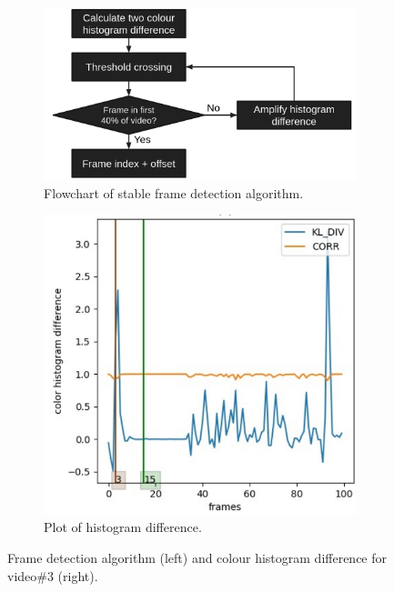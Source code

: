 \documentclass[journal,onecolumn,12pt]{IEEEtran}
\begin{document}
\begin{figure}[h]
	\centering
	\begin{subfigure}[b]{0.55\textwidth}
		\centering
		\includegraphics[width=\textwidth]{images/detectFrame.png}
		\caption{Flowchart of stable frame detection algorithm.}
		\label{fig:detectFrame}
	\end{subfigure}
	\begin{subfigure}[b]{0.35\textwidth}  
		\centering 
		\includegraphics[width=\textwidth]{images/Chistogram.png}
		\caption{Plot of histogram difference.}   
		\label{fig:Chistogram}
	\end{subfigure}
	\caption{Frame detection algorithm (left) and colour histogram difference for video\#3 (right).}
	\label{fig:stableframeAlgo}
\end{figure}
\end{document}
